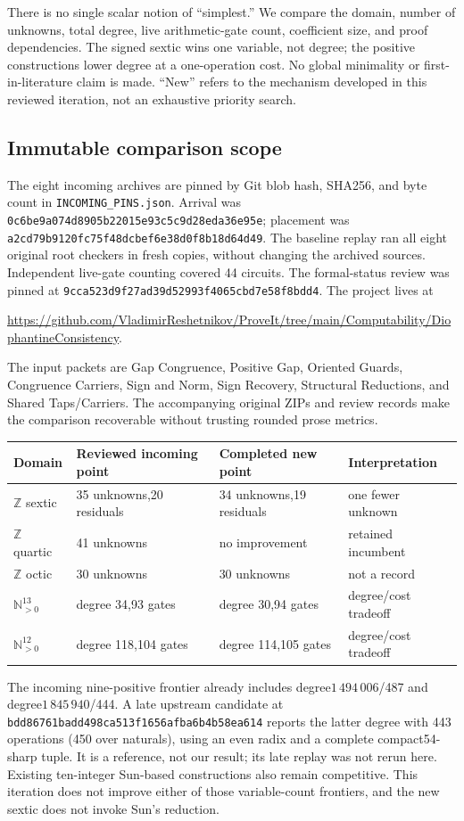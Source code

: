 \documentclass[11pt]{article}
\newcommand{\Z}{\mathbb Z}\newcommand{\N}{\mathbb N}
\begin{document}
There is no single scalar notion of ``simplest.'' We compare the domain,
number of unknowns, total degree, live arithmetic-gate count, coefficient
size, and proof dependencies. The signed sextic wins one variable, not degree;
the positive constructions lower degree at a one-operation cost. No global
minimality or first-in-literature claim is made. ``New'' refers to the
mechanism developed in this reviewed iteration, not an exhaustive priority
search.

\subsection{Immutable comparison scope}
The eight incoming archives are pinned by Git blob hash, SHA256, and byte
count in \texttt{INCOMING\_PINS.json}. Arrival was
\texttt{0c6be9a074d8905b22015e93c5c9d28eda36e95e}; placement was
\texttt{a2cd79b9120fc75f48dcbef6e38d0f8b18d64d49}.
The baseline replay ran all eight original root checkers in fresh copies,
without changing the archived sources. Independent live-gate counting covered
44 circuits. The formal-status review was pinned at
\texttt{9cca523d9f27ad39d52993f4065cbd7e58f8bdd4}.
The project lives at
\begin{center}\small
\url{https://github.com/VladimirReshetnikov/ProveIt/tree/main/Computability/DiophantineConsistency}.
\end{center}
The input packets are Gap Congruence, Positive Gap, Oriented Guards,
Congruence Carriers, Sign and Norm, Sign Recovery, Structural Reductions,
and Shared Taps/Carriers. The accompanying original ZIPs and review records
make the comparison recoverable without trusting rounded prose metrics.

\begin{center}\small
\begin{tabular}{llll}
\toprule
Domain & Reviewed incoming point & Completed new point & Interpretation\\
\midrule
$\Z$ sextic &35 unknowns,20 residuals&34 unknowns,19 residuals&one fewer unknown\\
$\Z$ quartic&41 unknowns&no improvement&retained incumbent\\
$\Z$ octic&30 unknowns&30 unknowns&not a record\\
$\N_{>0}^{13}$&degree 34,93 gates&degree 30,94 gates&degree/cost tradeoff\\
$\N_{>0}^{12}$&degree 118,104 gates&degree 114,105 gates&degree/cost tradeoff\\
\bottomrule
\end{tabular}
\end{center}
The incoming nine-positive frontier already includes degree$1\,494\,006$/487
and degree$1\,845\,940$/444. A late upstream candidate at
\texttt{bdd86761badd498ca513f1656afba6b4b58ea614} reports the latter degree
with 443 operations (450 over naturals), using an even radix and a complete
compact54-sharp tuple. It is a reference, not our result; its late replay was
not rerun here. Existing ten-integer Sun-based constructions also remain
competitive. This iteration does not improve either of those variable-count
frontiers, and the new sextic does not invoke Sun's reduction.
\end{document}
